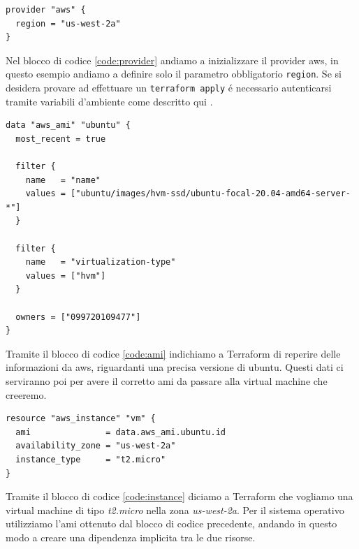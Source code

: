 \documentclass[12pt, a4paper, titlepage]{article}
\newenvironment{code}{\captionsetup{type=listing}}{}
\begin{document}
\begin{code}
	\begin{verbatim}
provider "aws" {
  region = "us-west-2a"
}
	\end{verbatim}
	\label{code:provider}
\end{code}
\bigskip

Nel blocco di codice \ref{code:provider} andiamo a inizializzare il provider \gls{aws}, in questo esempio andiamo a definire solo il parametro obbligatorio \texttt{region}. Se si desidera provare ad effettuare un \texttt{terraform apply} é necessario autenticarsi tramite variabili d'ambiente come descritto qui \cite{terraform_aws_auth}.

\begin{code}
	\begin{verbatim}
data "aws_ami" "ubuntu" {
  most_recent = true

  filter {
    name   = "name"
    values = ["ubuntu/images/hvm-ssd/ubuntu-focal-20.04-amd64-server-*"]
  }

  filter {
    name   = "virtualization-type"
    values = ["hvm"]
  }

  owners = ["099720109477"]
}
	\end{verbatim}
	\label{code:ami}
\end{code}
\bigskip

Tramite il blocco di codice \ref{code:ami} indichiamo a Terraform di reperire delle informazioni da \gls{aws}, riguardanti una precisa versione di ubuntu. Questi dati ci serviranno poi per avere il corretto \gls{ami} da passare alla virtual machine che creeremo.

\begin{code}
	\begin{verbatim}
resource "aws_instance" "vm" {
  ami               = data.aws_ami.ubuntu.id
  availability_zone = "us-west-2a"
  instance_type     = "t2.micro"
}
	\end{verbatim}
	\label{code:instance}
\end{code}
\bigskip

Tramite il blocco di codice \ref{code:instance} diciamo a Terraform che vogliamo una virtual machine di tipo \textit{t2.micro}\cite{aws_t_2} nella zona \textit{us-west-2a}. Per il sistema operativo utilizziamo l'\gls{ami} ottenuto dal blocco di codice precedente, andando in questo modo a creare una dipendenza implicita tra le due risorse.
\end{document}
